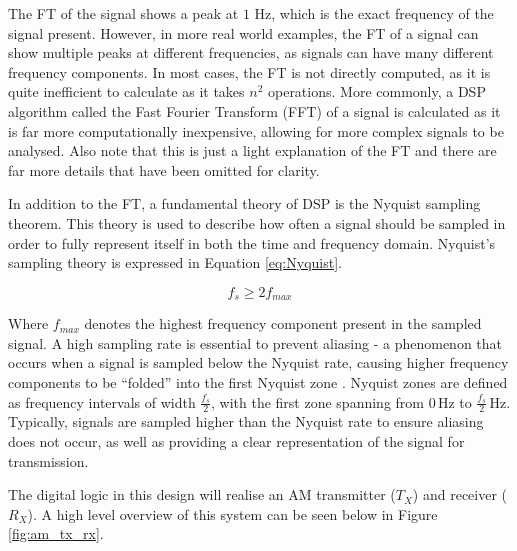 \documentclass[12pt, a4paper]{article}
\begin{document}
The FT of the signal shows a peak at $1$ Hz, which is the exact frequency of the signal present. However, in more real world examples, the FT of a signal can show multiple peaks at different frequencies, as signals can have many different frequency components. In most cases, the FT is not directly computed, as it is quite inefficient to calculate as it takes $n^2$ operations. More commonly, a DSP algorithm called the Fast Fourier Transform (FFT) of a signal is calculated as it is far more computationally inexpensive, allowing for more complex signals to be analysed. Also note that this is just a light explanation of the FT and there are far more details that have been omitted for clarity.

In addition to the FT, a fundamental theory of DSP is the Nyquist sampling theorem. This theory is used to describe how often a signal should be sampled in order to fully represent itself in both the time and frequency domain. Nyquist's sampling theory is expressed in Equation \ref{eq:Nyquist}.

\begin{equation}
    f_s \geq 2f_{max}\label{eq:Nyquist}
\end{equation}

Where $f_{max}$ denotes the highest frequency component present in the sampled signal. A high sampling rate is essential to prevent aliasing - a phenomenon that occurs when a signal is sampled below the Nyquist rate, causing higher frequency components to be \enquote{folded} into the first Nyquist zone \cite{RFSoC_Book}. Nyquist zones are defined as frequency intervals of width $\frac{f_s}{2}$, with the first zone spanning from 0\,Hz to $\frac{f_s}{2}$\,Hz. Typically, signals are sampled higher than the Nyquist rate to ensure aliasing does not occur, as well as providing a clear representation of the signal for transmission.

The digital logic in this design will realise an AM transmitter ($T_X$) and receiver ($R_X$). A high level overview of this system can be seen below in Figure \ref{fig:am_tx_rx}.
\end{document}
